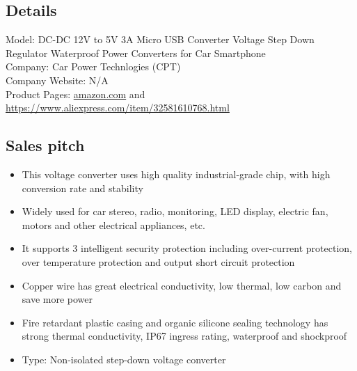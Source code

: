 \subsection{Details}
Model: DC-DC 12V to 5V 3A Micro USB Converter Voltage Step Down Regulator Waterproof Power Converters for Car Smartphone \\
Company: Car Power Technlogies (CPT) \\
Company Website: N/A \\
Product Pages: \href{https://www.amazon.com/Converter-Regulator-Waterproof-Converters-Smartphone/dp/B07H7X37T6/ref=asc_df_B07H7X37T6/?tag=hyprod-20&linkCode=df0&hvadid=241968535606&hvpos=1o1&hvnetw=g&hvrand=2561462318447783132&hvpone=&hvptwo=&hvqmt=&hvdev=c&hvdvcmdl=&hvlocint=&hvlocphy=9061320&hvtargid=pla-600746528101&psc=1}{amazon.com} and \href{https://www.aliexpress.com/item/32581610768.html}{https://www.aliexpress.com/item/32581610768.html} \\

\subsection{Sales pitch}
\begin{itemize}
	\item This voltage converter uses high quality industrial-grade chip, with high conversion rate and stability
	\item Widely used for car stereo, radio, monitoring, LED display, electric fan, motors and other electrical appliances, etc.
	\item It supports 3 intelligent security protection including over-current protection, over temperature protection and output short circuit protection
	\item Copper wire has great electrical conductivity, low thermal, low carbon and save more power
	\item Fire retardant plastic casing and organic silicone sealing technology has strong thermal conductivity, IP67 ingress rating, waterproof and shockproof
	\item Type: Non-isolated step-down voltage converter
\end{itemize}

